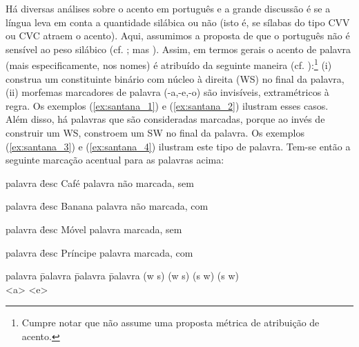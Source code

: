 \documentclass[output=paper]{LSP/langsci}
\begin{document}
Há diversas análises sobre o acento em português e a grande discussão é se a língua leva em conta a quantidade silábica ou não (isto é, se sílabas do tipo CVV ou CVC atraem o acento). Aqui, assumimos a proposta de que o português não é sensível ao peso silábico (cf. \citealt{lee1995,pereira1999,mateusdandrade2000}; mas \citealt{bisol1992,massini1995,bonilha2005,wetzels2006}). Assim, em termos gerais o acento de palavra (mais especificamente, nos nomes) é atribuído da seguinte maneira (cf. \citealt{lee1995}):\footnote{Cumpre notar que \citet{lee1995} não assume uma proposta métrica de atribuição de acento.} (i) construa um constituinte binário com núcleo à direita (WS) no final da palavra, (ii) morfemas marcadores de palavra (-a,-e,-o) são invisíveis, extramétricos à regra. Os exemplos (\ref{ex:santana_1}) e (\ref{ex:santana_2}) ilustram esses casos. Além disso, há palavras que são consideradas marcadas, porque ao invés de construir um WS, constroem um SW no final da palavra. Os exemplos (\ref{ex:santana_3}) e (\ref{ex:santana_4}) ilustram este tipo de palavra. Tem-se então a seguinte marcação acentual para as palavras acima:

\ea\label{ex:santana_1}
\begin{tabbing}
palavra \quad \= desc \kill
Café \> palavra não marcada, sem 
\end{tabbing}
\z
\ea\label{ex:santana_2}
\begin{tabbing}
palavra \quad \= desc \kill
Banana \> palavra não marcada, com 
\end{tabbing}
\z
\ea\label{ex:santana_3}
\begin{tabbing}
palavra \quad \= desc \kill
Móvel \> palavra marcada, sem 
\end{tabbing}
\z
\ea\label{ex:santana_4}
\begin{tabbing}
palavra \quad \= desc \kill
Príncipe \> palavra marcada, com 
\end{tabbing}
\z
\begin{exe}
\sn\begin{tabbing}
palavra \quad \= palavra \quad \= palavra \quad \= palavra \kill
(w s) \> (w s) \> (s w) \> (s w) \\
 \> <a> \>  \> <e>
\end{tabbing}
\end{exe}
\end{document}
